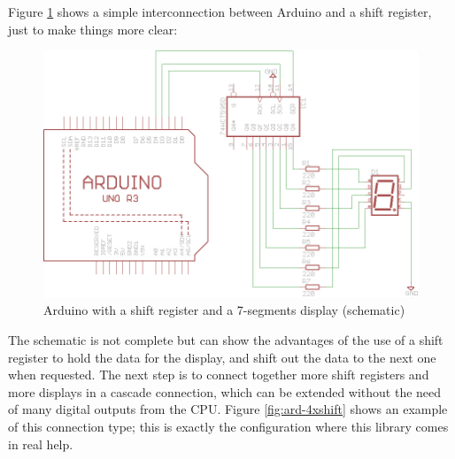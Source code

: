 \documentclass[11pt,english]{article}
\begin{document}
Figure \ref{fig:ard-shift} shows a simple interconnection between Arduino and a shift register, 
just to make things more clear:
%
\begin{figure}[htb]
\centering\includegraphics[scale=0.85]{img/Ard-shift}

\caption{Arduino with a shift register and a 7-segments display (schematic) \label{fig:ard-shift}}

\end{figure}

The schematic is not complete but can show the advantages of the use of a shift register to hold 
the data for the display, and shift out the data to the next one when requested. 
The next step is to connect together more shift registers and more displays in a cascade 
connection, which can be extended without the need of many digital outputs from the CPU.
Figure \ref{fig:ard-4xshift} shows an example of this connection type; this is exactly the configuration 
where this library comes in real help.
\end{document}
